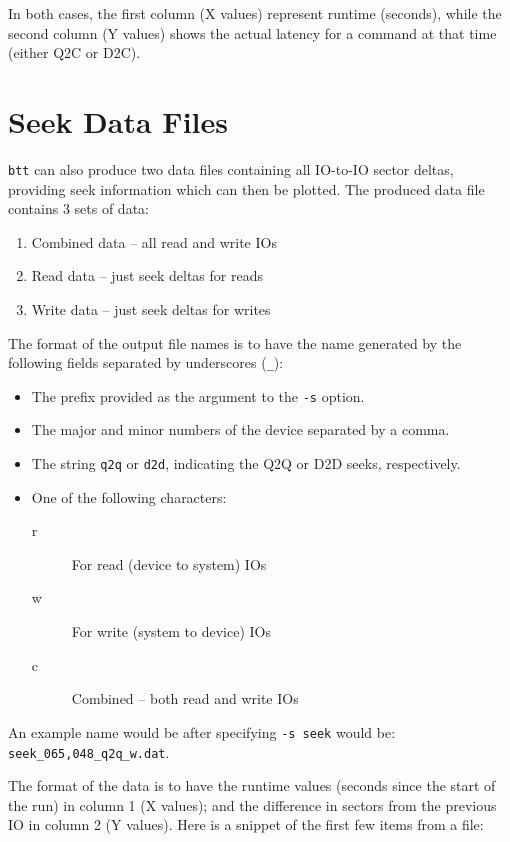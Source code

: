 \documentclass{article}
\begin{document}
  In both cases, the first column (X values) represent runtime (seconds),
  while the second column (Y values) shows the actual latency for a
  command at that time (either Q2C or D2C).

\newpage\section{\label{sec:seek}Seek Data Files}

  \texttt{btt} can also produce two data files containing all IO-to-IO sector
  deltas, providing seek information which can then be plotted. The
  produced data file contains 3 sets of data:

  \begin{enumerate}
     \item Combined data -- all read and write IOs

     \item Read data -- just seek deltas for reads

     \item Write data -- just seek deltas for writes
  \end{enumerate}

  The format of the output file names is to have the name generated by
  the following fields separated by underscores (\texttt{\_}):
 
  \begin{itemize}
    \item The prefix provided as the argument to the \texttt{-s} option.
    \item The major and minor numbers of the device separated by a comma.
    \item The string \texttt{q2q} or \texttt{d2d}, indicating the Q2Q or
          D2D seeks, respectively.
    \item One of the following characters:
    	\begin{description}
	  \item[r] For read (device to system) IOs
	  \item[w] For write (system to device) IOs
	  \item[c] Combined -- both read and write IOs
	\end{description}
  \end{itemize}

  An example name would be after specifying \texttt{-s seek} would be:
  \texttt{seek\_065,048\_q2q\_w.dat}.

  The format of the data is to have the runtime values (seconds since
  the start of the run) in column 1 (X values); and the difference in
  sectors from the previous IO in column 2 (Y values). Here is a snippet
  of the first few items from a file:
\end{document}
